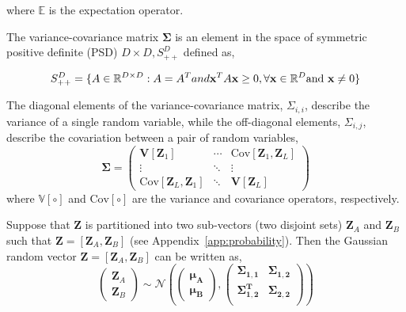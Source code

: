 where $\mathbb{E}$ is the expectation operator.

The variance-covariance matrix $\boldsymbol{\Sigma}$ is an element in the space of symmetric positive definite (PSD) $D \times D, S_{++}^D$ defined as,

\begin{equation}
	S_{++}^D = \{A \in \mathbb{R}^{D\times D}: A = A^T and \mathbf{x}^T A \mathbf{x} \geq 0, \forall \mathbf{x} \in \mathbb{R}^D \textnormal{and } \mathbf{x} \neq 0 \}
	\label{eq:def_covariance_matrix}
\end{equation}






The diagonal elements of the variance-covariance matrix, $\Sigma_{i,i}$, describe the variance of a single random variable,
while the off-diagonal elements, $\Sigma_{i,j}$, describe the covariation between a pair of random variables,
\begin{equation}
	\boldsymbol{\Sigma} =
	\begin{pmatrix}
			\mathbf{V}[\mathbf{Z}_1] & \cdots                & \text{Cov}[\mathbf{Z}_1, \mathbf{Z}_L] \\
			\vdots                   & \ddots                & \vdots \\
			\text{Cov}[\mathbf{Z}_L, \mathbf{Z}_1] & \ddots & \mathbf{V}[\mathbf{Z}_L]
	\end{pmatrix}
\label{eq:covariance_matrix}
\end{equation}
where $\mathbb{V} [\circ]$ and $\text{Cov} [\circ]$ are the variance and covariance operators, respectively. 

Suppose that $\mathbf{Z}$ is partitioned into two sub-vectors (two disjoint sets) $\mathbf{Z}_A$ and $\mathbf{Z}_B$ such that $\mathbf{Z} = [\mathbf{Z}_A, \mathbf{Z}_B]$ 
(see Appendix~\ref{app:probability}).
Then the Gaussian random vector $\mathbf{Z} = [\mathbf{Z}_A, \mathbf{Z}_B]$ can be written as,
\begin{equation}
	\begin{pmatrix}
		 \mathbf{Z}_A \\
		 \mathbf{Z}_B
	\end{pmatrix} \sim \mathcal{N} \left (
	\begin{pmatrix}
			\boldsymbol{\mu_A} \\
			\boldsymbol{\mu_B}
	\end{pmatrix}, \begin{pmatrix}
		  \boldsymbol{\Sigma_{1,1}}   & \boldsymbol{\Sigma_{1,2}} \\
			\boldsymbol{\Sigma^T_{1,2}} & \boldsymbol{\Sigma_{2,2}} \\
	\end{pmatrix} \right)
\label{eq:gaussian_random_vector}
\end{equation}

